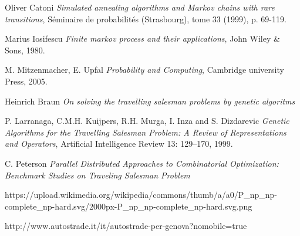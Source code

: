 \documentclass{article}
\begin{document}
\newpage

\begin{thebibliography}{9}

Oliver Catoni
\textit{Simulated annealing algorithms and Markov chains with rare transitions}, Séminaire de probabilités (Strasbourg), tome 33 (1999), p. 69-119.

Marius Iosifescu
\textit{Finite markov process and their applications}, John Wiley \& Sons, 1980.

M. Mitzenmacher, E. Upfal
\textit{ Probability and Computing}, Cambridge university Press, 2005.

Heinrich Braun
\textit{On solving the travelling salesman problems by genetic algoritms}

P. Larranaga, C.M.H. Kuijpers, R.H. Murga, I. Inza and S. Dizdarevic
\textit{Genetic Algorithms for the Travelling Salesman Problem: A Review of Representations and Operators}, Artificial Intelligence Review 13: 129–170, 1999.

C. Peterson
\textit{Parallel Distributed Approaches to Combinatorial Optimization: Benchmark Studies on Traveling Salesman Problem}

https://upload.wikimedia.org/wikipedia/commons/thumb/a/a0/P\_np\_np-complete\_np-hard.svg/2000px-P\_np\_np-complete\_np-hard.svg.png

http://www.autostrade.it/it/autostrade-per-genova?nomobile=true

 
\end{thebibliography}
\end{document}
